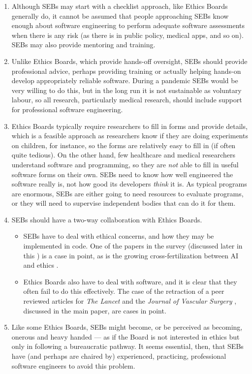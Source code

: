 \documentclass{article}
\begin{document}
\begin{enumerate}\raggedright
\item 
Although SEBs may start with a checklist approach, like Ethics Boards generally do, it cannot be assumed that people approaching SEBs know enough about software engineering to perform adequate software assessments when there is any risk (as there is in public policy, medical apps, and so on). SEBs may also provide mentoring and training.

\item
Unlike Ethics Boards, which provide hands-off oversight, SEBs should provide professional advice, perhaps providing training or actually helping hands-on develop appropriately reliable software. During a pandemic SEBs would be very willing to do this, but in the long run it is not sustainable as voluntary labour, so all research, particularly medical research, should include support for professional software engineering. 

\item 
Ethics Boards typically require researchers to fill in forms and provide details, which is a feasible approach as researchers know if they are doing experiments on children, for instance, so the forms are relatively easy to fill in (if often quite tedious). On the other hand, few healthcare and medical researchers understand software and programming, so they are \emph{not\/} able to fill in useful software forms on their own. SEBs need to know how well engineered the software really is, not how good its developers \emph{think\/} it is. As typical programs are enormous, SEBs are either going to need resources to evaluate programs, or they will need to supervise independent bodies that can do it for them. 

\item
SEBs should have a two-way collaboration with Ethics Boards. 

\begin{itemize}
\item SEBs have to deal with ethical concerns, and how they may be implemented in code. One of the papers \cite{ethics-paper} in the survey (discussed later in this \supplement) is a case in point, as is the growing cross-fertilization between AI and ethics .

\item Ethics Boards also have to deal with software, and it is clear that they often fail to do this effectively. The case of the retraction of a peer reviewed articles for \emph{The Lancet\/} \cite{science-lancet1,science-lancet2,lancet-learning} and the \emph{Journal of Vascular Surgery\/} \cite{jvs1,jvs2,jvs3}, discussed in the main paper, are cases in point.
\end{itemize}

\item
Like some Ethics Boards, SEBs might become, or be perceived as becoming, onerous and heavy handed --- as if the Board is not interested in ethics but only in following a bureaucratic pathway. It seems essential, then, that SEBs have (and perhaps are chaired by) experienced, practicing, professional software engineers to avoid this problem. 
\end{enumerate}
\end{document}
